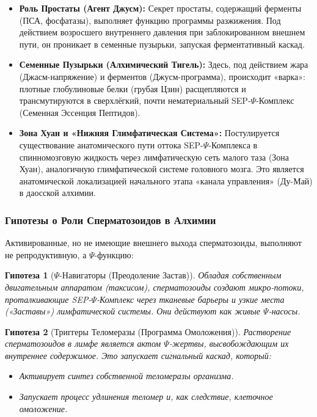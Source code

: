 \documentclass[a4paper,12pt]{article}
\newtheorem{hypothesis}{Гипотеза}
\begin{document}
\begin{itemize}
	\item \textbf{Роль Простаты (Агент Джусм):} Секрет простаты, содержащий ферменты (ПСА, фосфатазы), выполняет функцию программы разжижения. Под действием возросшего внутреннего давления при заблокированном внешнем пути, он проникает в семенные пузырьки, запуская ферментативный каскад.
	
	\item \textbf{Семенные Пузырьки (Алхимический Тигель):} Здесь, под действием жара (Джасм-напряжение) и ферментов (Джусм-программа), происходит «варка»: плотные глобулиновые белки (грубая Цзин) расщепляются и трансмутируются в сверхлёгкий, почти нематериальный SEP-$\Psi$-Комплекс (Семенная Эссенция Пептидов).
	
	\item \textbf{Зона Хуан и «Нижняя Глимфатическая Система»:} Постулируется существование анатомического пути оттока SEP-$\Psi$-Комплекса в спинномозговую жидкость через лимфатическую сеть малого таза (Зона Хуан), аналогичную глимфатической системе головного мозга. Это является анатомической локализацией начального этапа «канала управления» (Ду-Май) в даосской алхимии.
\end{itemize}

\subsubsection{Гипотезы о Роли Сперматозоидов в Алхимии}

Активированные, но не имеющие внешнего выхода сперматозоиды, выполняют не репродуктивную, а $\Psi$-функцию:

\begin{hypothesis}[$\Psi$-Навигаторы (Преодоление Застав)]
	Обладая собственным двигательным аппаратом (таксисом), сперматозоиды создают микро-потоки, проталкивающие SEP-$\Psi$-Комплекс через тканевые барьеры и узкие места («Заставы») лимфатической системы. Они действуют как живые $\Psi$-насосы.
\end{hypothesis}

\begin{hypothesis}[Триггеры Теломеразы (Программа Омоложения)]
	Растворение сперматозоидов в лимфе является актом $\Psi$-жертвы, высвобождающим их внутреннее содержимое. Это запускает сигнальный каскад, который:
	
	\begin{itemize}
		\item Активирует синтез собственной теломеразы организма.
		\item Запускает процесс удлинения теломер и, как следствие, клеточное омоложение.
	\end{itemize}
\end{hypothesis}
\end{document}
